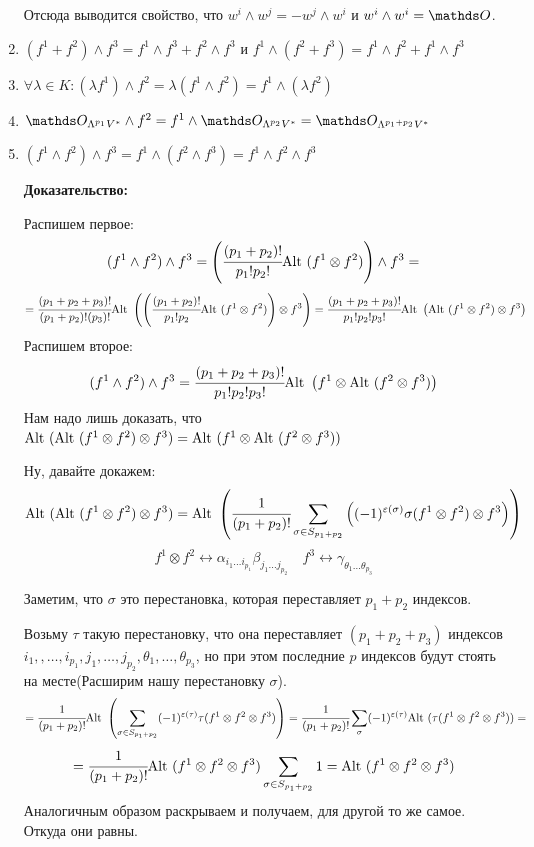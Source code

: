 \begin{enumerate}
    Отсюда выводится свойство, что $w^i \wedge w^j = - w^j \wedge w^i$ и $w^i \wedge w^i = \zero$. 

    \item $(f^1+f^2)\wedge f^3 = f^1\wedge f^3 + f^2 \wedge f^3$ и $f^1 \wedge (f^2 + f^3) = f^1 \wedge f^2 + f^1 \wedge f^3$
    \item $\forall \lambda \in K: (\lambda f^1)\wedge f^2 = \lambda(f^1 \wedge f^2) = f^1 \wedge (\lambda f^2)$
    \item $\zero_{\Lambda^{p_1}V^*} \wedge f^2 = f^1 \wedge \zero_{\Lambda^{p_2}V^*}=\zero_{\Lambda^{p_1+p_2}V^*}$
    \item $(f^1 \wedge f^2 ) \wedge f^3 = f^1 \wedge (f^2 \wedge f^3) = f^1 \wedge f^2 \wedge f^3$

    \textbf{Доказательство:}

    Распишем первое:
    $$(f^1 \wedge f^2)\wedge f^3 = \left(\cfrac{(p_1+p_2)!}{p_1! p_2!}\text{Alt } (f^1 \otimes f^2)\right)\wedge f^3 =$$  $$=\cfrac{(p_1 + p_2 + p_3)!}{(p_1+p_2)!(p_3)!} \text{Alt }\left(\left(\cfrac{(p_1+p_2)!}{p_1! p_2} \text{Alt } (f^1 \otimes f^2)\right)\otimes f^3 \right) = \cfrac{(p_1+p_2+p_3)!}{p_1!p_2!p_3!} \text{Alt } \left( \text{Alt }(f^1 \otimes f^2) \otimes f^3 \right)$$
    Распишем второе:
    $$(f^1 \wedge f^2)\wedge f^3 = \cfrac{(p_1+p_2+p_3)!}{p_1!p_2!p_3!} \text{Alt } \left( f^1 \otimes \text{Alt }(f^2 \otimes f^3) \right)$$
    Нам надо лишь доказать, что $\text{Alt }(\text{Alt }(f^1 \otimes f^2)\otimes f^3) = \text{Alt } (f^1 \otimes \text{Alt } (f^2 \otimes f^3))$

    Ну, давайте докажем:
    $$\text{Alt }(\text{Alt }(f^1 \otimes f^2)\otimes f^3) = \text{Alt } \left(\cfrac{1}{(p_1+p_2)!} \sum\limits_{\sigma \in S_{p_1+p_2}}\left((-1)^{\varepsilon(\sigma)}\sigma(f^1\otimes f^2)\otimes f^3\right)\right) $$
    $$f^1 \otimes f^2 \leftrightarrow \alpha_{i_1\ldots i_{p_1}}\beta_{j_1\ldots j_{p_2}} \quad f^3 \leftrightarrow \gamma_{\theta_1\ldots \theta_{p_3}}$$
    
    Заметим, что $\sigma $ это перестановка, которая переставляет $p_1 + p_2$ индексов.

    Возьму $\tau$ такую перестановку, что она переставляет $(p_1+p_2+p_3)$ индексов $i_1,,\ldots, i_{p_1},j_1,\ldots, j_{p_2},\theta_1,\ldots,\theta_{p_3}$, но при этом последние $p$ индексов будут стоять на месте(Расширим нашу перестановку $\sigma$).
    $$= \cfrac{1}{(p_1+p_2)!}\text{Alt }\left(\sum_{\sigma \in S_{p_1+p_2}}(-1)^{\varepsilon(\tau)}\tau(f^1 \otimes f^2 \otimes f^3)\right) = \cfrac{1}{(p_1+p_2)!}\sum\limits_{\sigma} (-1)^{\varepsilon(\tau)}\text{Alt }(\tau(f^1 \otimes f^2 \otimes f^3)) =$$$$= \cfrac{1}{(p_1+p_2)!}\text{Alt } (f^1 \otimes f^2 \otimes f^3)\sum\limits_{\sigma \in S_{p_1+p_2}}1 = \text{Alt } (f^1 \otimes f^2 \otimes f^3)$$
    Аналогичным образом раскрываем и получаем, для другой то же самое. Откуда они равны.



\end{enumerate}
